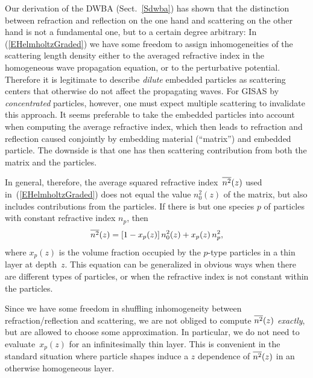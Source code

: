 
Our derivation of the DWBA (Sect.~\ref{Sdwba}) has shown
that the distinction between refraction and reflection on the one hand
and scattering on the other hand is not a fundamental one,
but to a certain degree arbitrary:
In (\ref{EHelmholtzGraded}) we have some freedom to assign
inhomogeneities of the scattering length density
either to the averaged refractive index in the
homogeneous wave propagation equation,
or to the perturbative potential.
Therefore it is legitimate
to describe \textit{dilute} embedded particles
as scattering centers that otherwise do not affect the propagating waves.
For GISAS by \textit{concentrated} particles, however,
one must expect multiple scattering to invalidate this approach.
It seems preferable to take the embedded particles into account
when computing the average refractive index,
which then leads to refraction and reflection caused conjointly
by embedding material (``matrix'') and embedded particle.
%
The downside is that one has then scattering contribution
from both the matrix and the particles.

In general, therefore, the average squared refractive index~$\overline{n^2}(z)$
used in~(\ref{EHelmholtzGraded})
does not equal the value $n_0^2(z)$ of the matrix,
but also includes contributions from the particles.
If there is but one species $p$ of particles
%
with constant refractive index $n_p$,
then
\begin{equation}
  \overline{n^2}(z) = [1-x_p(z)]\,n_0^2(z) + x_p(z)\, n_p^2,
\end{equation}
where $x_p(z)$ is the volume fraction occupied by the $p$-type particles
in a thin layer at depth~$z$.
This equation can be generalized in obvious ways
when there are different types of particles,
or when the refractive index is not constant within the particles.

Since we have some freedom in shuffling inhomogeneity
between refraction/reflection and scattering,
we are not obliged to compute $\overline{n^2}(z)$ \textit{exactly},
but are allowed to choose some approximation.
In particular, we do not need to evaluate~$x_p(z)$
for an infinitesimally thin layer.
This is convenient in the standard situation where particle shapes
induce a $z$ dependence of $\overline{n^2}(z)$ in an otherwise homogeneous layer.

